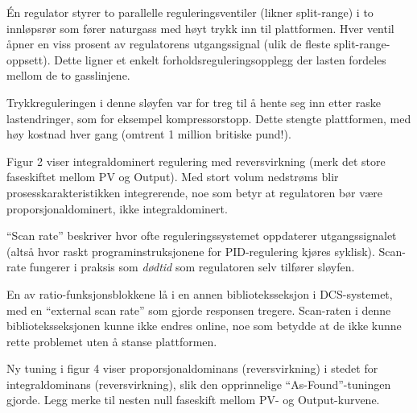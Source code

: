 












Én regulator styrer to parallelle reguleringsventiler (likner split-range) i to innløpsrør som fører naturgass med høyt trykk inn til plattformen. Hver ventil åpner en viss prosent av regulatorens utgangssignal (ulik de fleste split-range-oppsett). Dette ligner et enkelt forholdsreguleringsopplegg der lasten fordeles mellom de to gasslinjene.

\vskip 10pt

Trykkreguleringen i denne sløyfen var for treg til å hente seg inn etter raske lastendringer, som for eksempel kompressorstopp. Dette stengte plattformen, med høy kostnad hver gang (omtrent 1 million britiske pund!).

\vskip 10pt

Figur 2 viser integraldominert regulering med reversvirkning (merk det store faseskiftet mellom PV og Output). Med stort volum nedstrøms blir prosesskarakteristikken integrerende, noe som betyr at regulatoren bør være proporsjonaldominert, ikke integraldominert.

\vskip 10pt

``Scan rate'' beskriver hvor ofte reguleringssystemet oppdaterer utgangssignalet (altså hvor raskt programinstruksjonene for PID-regulering kjøres syklisk). Scan-rate fungerer i praksis som {\it dødtid} som regulatoren selv tilfører sløyfen.

\vskip 10pt

En av ratio-funksjonsblokkene lå i en annen biblioteksseksjon i DCS-systemet, med en ``external scan rate'' som gjorde responsen tregere. Scan-raten i denne biblioteksseksjonen kunne ikke endres online, noe som betydde at de ikke kunne rette problemet uten å stanse plattformen.

\vskip 10pt

Ny tuning i figur 4 viser proporsjonaldominans (reversvirkning) i stedet for integraldominans (reversvirkning), slik den opprinnelige ``As-Found''-tuningen gjorde. Legg merke til nesten null faseskift mellom PV- og Output-kurvene.















